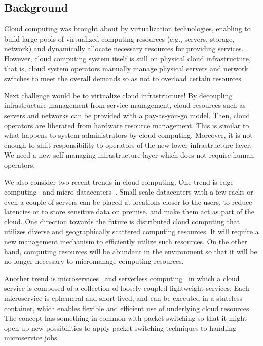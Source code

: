 \subsection{Background}

Cloud computing was brought about by virtualization technologies,
enabling to build large pools of virtualized computing resources (e.g.,
servers, storage, network) and dynamically allocate necessary resources
for providing services.
However, cloud computing system itself is still on physical cloud
infrastructure, that is, cloud system operators manually manage
physical servers and network switches to meet the overall demands
so as not to overload certain resources.

Next challenge would be to virtualize cloud infrastructure!
By decoupling infrastructure management from service management,
cloud resources such as servers and networks can be provided with a
pay-as-you-go model.
Then, cloud operators are liberated from hardware resource management.
This is similar to what happens to system administrators by cloud
computing.
Moreover, it is not enough to shift responsibility to operators of the
new lower infrastructure layer. We need a new self-managing
infrastructure layer which does not require human operators.

We also consider two recent trends in cloud computing.
One trend is edge computing~\cite{Lopez-2015} and
micro datacenters~\cite{Greenberg-2009}.
Small-scale datacenters with a few racks or even a couple of servers
can be placed at locations closer to the users, to reduce latencies
or to store sensitive data on premise, and make them act as part of
the cloud.
One direction towards the future is distributed cloud computing that
utilizes diverse and geographically scattered computing resources.
It will require a new management mechanism to efficiently utilize such
resources.
On the other hand, computing resources will be abundant in the
environment so that it will be no longer necessary to micromanage
computing resources.

Another trend is microservices~\cite{nadareishvili2016microservice}
and serverless computing~\cite{Shafiei-2022} in which
a cloud service is composed of a collection of loosely-coupled
lightweight services.
Each microservice is ephemeral and short-lived, and can be executed
in a stateless container,
which enables flexible and efficient use of underlying cloud
resources.
The concept has something in common with packet switching so that
it might open up new possibilities to apply packet switching
techniques to handling microservice jobs.

